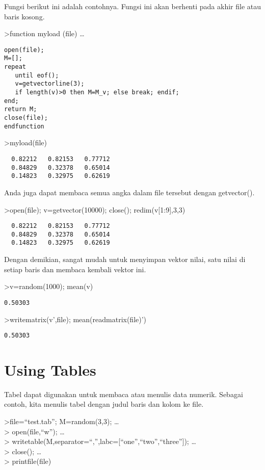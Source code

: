 \documentclass[
]{book}
\begin{document}
Fungsi berikut ini adalah contohnya. Fungsi ini akan berhenti pada akhir file atau baris kosong.

\textgreater function myload (file) \ldots{}

\begin{verbatim}
open(file);
M=[];
repeat
   until eof();
   v=getvectorline(3);
   if length(v)>0 then M=M_v; else break; endif;
end;
return M;
close(file);
endfunction
\end{verbatim}

\textgreater myload(file)

\begin{verbatim}
  0.82212   0.82153   0.77712 
  0.84829   0.32378   0.65014 
  0.14823   0.32975   0.62619 
\end{verbatim}

Anda juga dapat membaca semua angka dalam file tersebut dengan getvector().

\textgreater open(file); v=getvector(10000); close(); redim(v{[}1:9{]},3,3)

\begin{verbatim}
  0.82212   0.82153   0.77712 
  0.84829   0.32378   0.65014 
  0.14823   0.32975   0.62619 
\end{verbatim}

Dengan demikian, sangat mudah untuk menyimpan vektor nilai, satu nilai di setiap baris dan membaca kembali vektor ini.

\textgreater v=random(1000); mean(v)

\begin{verbatim}
0.50303
\end{verbatim}

\textgreater writematrix(v',file); mean(readmatrix(file)')

\begin{verbatim}
0.50303
\end{verbatim}

\section{Using Tables}\label{using-tables}

Tabel dapat digunakan untuk membaca atau menulis data numerik. Sebagai contoh, kita menulis tabel dengan judul baris dan kolom ke file.

\textgreater file=``test.tab''; M=random(3,3); \ldots{}\\
\textgreater{} open(file,``w''); \ldots{}\\
\textgreater{} writetable(M,separator=``,'',labc={[}``one'',``two'',``three''{]}); \ldots{}\\
\textgreater{} close(); \ldots{}\\
\textgreater{} printfile(file)
\end{document}
